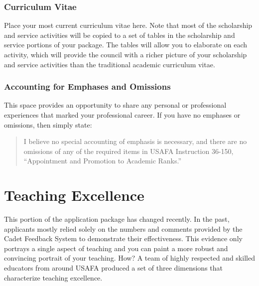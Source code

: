 \documentclass[11pt,titlepage]{article}
\begin{document}
%

\section{Curriculum Vitae}  %
Place your most current curriculum vitae here.
Note that most of the scholarship and service activities will be copied to a set of tables in the scholarship and service portions of your package.
The tables will allow you to elaborate on each activity, which will provide the council with a richer picture of your scholarship and service activities than the traditional academic curriculum vitae.

%

\section{Accounting for Emphases and Omissions}  %
This space provides an opportunity to share any personal or professional experiences that marked your professional career.
If you have no emphases or omissions, then simply state:

\begin{quote}
  I believe no special accounting of emphasis is necessary, and there are no omissions of any of the required items in USAFA Instruction 36-150, ``Appointment and Promotion to Academic Ranks.''
\end{quote}

\part{Teaching Excellence}  %

This portion of the application package has changed recently.
In the past, applicants mostly relied solely on the numbers and comments provided by the Cadet Feedback System to demonstrate their effectiveness.
This evidence only portrays a single aspect of teaching and you can paint a more robust and convincing portrait of your teaching.
How? A team of highly respected and skilled educators from around USAFA produced a set of three dimensions that characterize teaching excellence.
\end{document}
